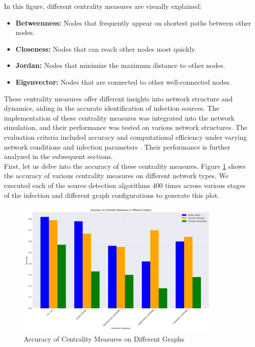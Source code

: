 In this figure, different centrality measures are visually explained:
\begin{itemize}
    \item \textbf{Betweenness:} Nodes that frequently appear on shortest paths between other nodes.
    \item \textbf{Closeness:} Nodes that can reach other nodes most quickly.
    \item \textbf{Jordan:} Nodes that minimize the maximum distance to other nodes.
    \item \textbf{Eigenvector:} Nodes that are connected to other well-connected nodes.
\end{itemize}

These centrality measures offer different insights into network structure and dynamics, aiding in the accurate identification of infection sources. The implementation of these centrality measures was integrated into the network simulation, and their performance was tested on various network structures. The evaluation criteria included accuracy and computational efficiency under varying network conditions and infection parameters \cite{liu2011}. Their performance is further analyzed in the subsequent sections.\\

First, let us delve into the accuracy of these centrality measures. Figure \ref{fig:accuracy_centrality_measures} shows the accuracy of various centrality measures on different network types. We executed each of the source detection algorithms 400 times across various stages of the infection and different graph configurations to generate this plot.

\begin{figure}[H]
    \centering
    \includegraphics[width=0.9\textwidth]{img/Accuracy_Centrality_Measures.png}
    \caption{Accuracy of Centrality Measures on Different Graphs}
    \label{fig:accuracy_centrality_measures}
\end{figure}

